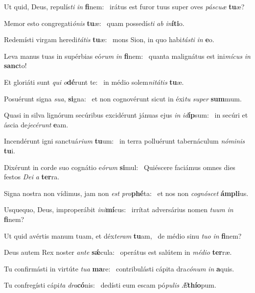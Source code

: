 \item Ut quid, Deus, repulís\textit{ti} \textit{in} \textbf{fi}nem:~\psstar{} irátus est furor tuus super oves \textit{páscuæ} \textbf{tu}æ?
\item Memor esto congregati\textit{ónis} \textbf{tu}æ:~\psstar{} quam possedís\textit{ti} \textit{ab} \textit{in}\textbf{í}\textbf{ti}o.
\item Redemísti virgam heredi\textit{tátis} \textbf{tu}æ:~\psstar{} mons Sion, in quo habi\textit{tásti} \textit{in} \textbf{e}o.
\item Leva manus tuas in supérbias eó\textit{rum} \textit{in} \textbf{fi}nem:~\psstar{} quanta malignátus est ini\textit{mícus} \textit{in} \textbf{sanc}to!
\item Et gloriáti sunt \textit{qui} \textit{o}\textbf{dé}runt te:~\psstar{} in médio solem\textit{nitátis} \textbf{tu}æ.
\item Posuérunt signa \textit{sua}, \textbf{si}gna:~\psstar{} et non cognovérunt sicut in éxi\textit{tu} \textit{super} \textbf{sum}mum.
\item Quasi in silva lignórum secúribus excidérunt jánuas ejus \textit{in} \textit{id}\textbf{íp}sum:~\psstar{} in secúri et áscia de\textit{jecérunt} \textbf{e}am.
\item Incendérunt igni sanctuá\textit{rium} \textbf{tu}um:~\psstar{} in terra polluérunt tabernáculum \textit{nóminis} \textbf{tu}i.
\item Dixérunt in corde suo cognátio e\textit{órum} \textbf{si}mul:~\psstar{} Quiéscere faciámus omnes dies festos \textit{Dei} \textit{a} \textbf{ter}ra.
\item Signa nostra non vídimus, jam non \textit{est} \textit{pro}\textbf{phé}ta:~\psstar{} et nos non \textit{cognóscet} \textbf{ám}\textbf{pli}us.
\item Usquequo, Deus, improperábit \textit{ini}\textbf{mí}cus:~\psstar{} irrítat adversárius nomen \textit{tuum} \textit{in} \textbf{fi}nem?
\item Ut quid avértis manum tuam, et déx\textit{teram} \textbf{tu}am,~\psstar{} de médio sinu \textit{tuo} \textit{in} \textbf{fi}nem?
\item Deus autem Rex noster \textit{ante} \textbf{sǽ}cula:~\psstar{} operátus est salútem in \textit{médio} \textbf{ter}ræ.
\item Tu confirmásti in virtúte \textit{tua} \textbf{ma}re:~\psstar{} contribulásti cápita dra\textit{cónum} \textit{in} \textbf{a}quis.
\item Tu confregísti cápi\textit{ta} \textit{dra}\-\textbf{có}\-nis:~\psstar{} dedísti eum escam pó\textit{pulis} \textit{Æ}\textbf{thí}\textbf{o}pum.
